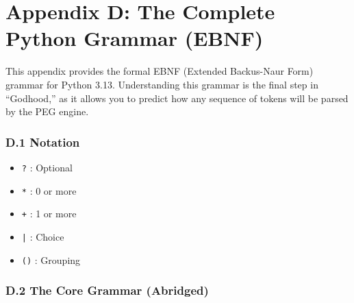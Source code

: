 \hypertarget{appendix-d-the-complete-python-grammar-ebnf}{%
\chapter{Appendix D: The Complete Python Grammar
(EBNF)}\label{appendix-d-the-complete-python-grammar-ebnf}}

This appendix provides the formal EBNF (Extended Backus-Naur Form)
grammar for Python 3.13. Understanding this grammar is the final step in
``Godhood,'' as it allows you to predict how any sequence of tokens will
be parsed by the PEG engine.

\hypertarget{d.1-notation}{%
\subsection{D.1 Notation}\label{d.1-notation}}

\begin{itemize}
\tightlist
\item
  \passthrough{\lstinline!?!} : Optional
\item
  \passthrough{\lstinline!*!} : 0 or more
\item
  \passthrough{\lstinline!+!} : 1 or more
\item
  \passthrough{\lstinline!|!} : Choice
\item
  \passthrough{\lstinline!()!} : Grouping
\end{itemize}

\hypertarget{d.2-the-core-grammar-abridged}{%
\subsection{D.2 The Core Grammar
(Abridged)}\label{d.2-the-core-grammar-abridged}}

